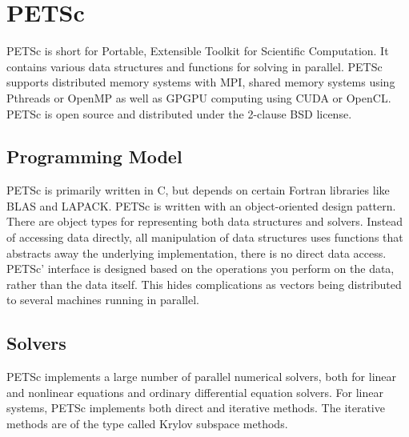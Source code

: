\section{PETSc}

PETSc is short for Portable, Extensible Toolkit for Scientific Computation. 
It contains various data structures and functions for 
solving  in parallel. PETSc supports distributed 
memory systems with MPI, shared memory systems using Pthreads or OpenMP as well 
as GPGPU computing using CUDA or OpenCL. PETSc is open source and distributed 
under the 2-clause BSD license\cite{petsc-web-page}.

\subsection{Programming Model}
PETSc is primarily written in C, but depends on certain Fortran libraries like BLAS 
and LAPACK. PETSc is written with an object-oriented design pattern.
There are object types for representing both data structures and solvers.
Instead of accessing data directly, all manipulation of data structures uses functions
that abstracts away the underlying implementation, there is no direct data access. 
PETSc' interface is designed based on the operations you perform on the data, rather 
than the data itself. This hides complications as vectors being distributed to 
several machines running in parallel.

\subsection{Solvers}
PETSc implements a large number of parallel numerical solvers, both for linear and 
nonlinear equations and ordinary differential equation solvers. For linear systems, 
PETSc implements both direct and iterative methods. The iterative methods are of the 
type called Krylov subspace methods. 
